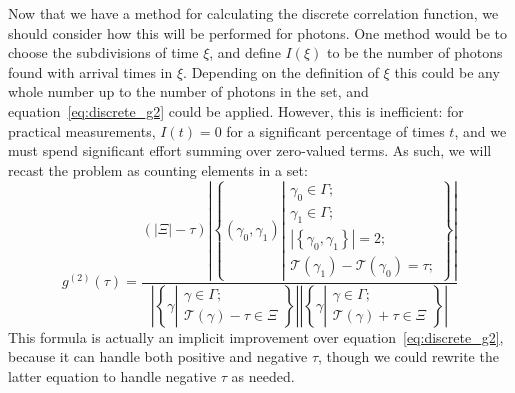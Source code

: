 \documentclass{article}
\newcommand{\braces}[1]{\ensuremath{\left\lbrace #1 \right\rbrace}}
\newcommand{\parens}[1]{\ensuremath{\left( #1 \right)}}
\newcommand{\setbuilder}[2]{\ensuremath{\braces{#1 \left| #2 \right.}}}
\newcommand{\gn}[1]{\ensuremath{g^{(#1)}}}
\newcommand{\abs}[1]{\ensuremath{\left|#1\right|}}
\newcommand{\Time}{\ensuremath{\mathcal{T}}}
\newcommand{\photon}{\ensuremath{\gamma}}
\newcommand{\photons}{\ensuremath{\Gamma}}
\newcommand{\integrationtime}{\ensuremath{\Xi}}
\newcommand{\timewindow}{\ensuremath{\xi}}
\begin{document}
Now that we have a method for calculating the discrete correlation function, we should consider how this will be performed for photons. One method would be to choose the subdivisions of time $\timewindow$, and define $I(\timewindow)$ to be the number of photons found with arrival times in $\timewindow$. Depending on the definition of $\timewindow$ this could be any whole number up to the number of photons in the set, and equation~\ref{eq:discrete_g2} could be applied. However, this is inefficient: for practical measurements, $I(t)=0$ for a significant percentage of times $t$, and we must spend significant effort summing over zero-valued terms. As such, we will recast the problem as counting elements in a set:
\begin{equation}
\label{eq:photon_g2}
\gn{2}(\tau) = \frac{\parens{\abs{\integrationtime}-\tau}
                     \abs{\setbuilder{(\photon_{0},\photon_{1})}
                                     {\begin{aligned}
                                      \photon_{0}\in\photons;\\
                                      \photon_{1}\in\photons;\\
                                      \abs{\braces{\photon_{0},\photon_{1}}}=2;\\
                                      \Time(\photon_{1})-\Time(\photon_{0})=\tau;
                                      \end{aligned}}}}
                    {
                             \abs{\setbuilder{\photon}{\begin{aligned}
                                                      \photon\in\photons;\\
                                                      \Time(\photon)-\tau\in\integrationtime
                                                      \end{aligned}}}
                             \abs{\setbuilder{\photon}{\begin{aligned}
                                                      \photon\in\photons;\\
                                                      \Time(\photon)+\tau\in\integrationtime
                                                      \end{aligned}}}}
\end{equation} 
This formula is actually an implicit improvement over equation~\ref{eq:discrete_g2}, because it can handle both positive and negative $\tau$, though we could rewrite the latter equation to handle negative $\tau$ as needed.
\end{document}
